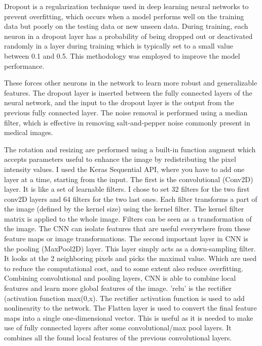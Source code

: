 \documentclass[twocolumn]{article}
\begin{document}
Dropout is a regularization technique used in deep learning neural networks to prevent overfitting, which occurs when a model performs well on the training data but poorly on the testing data or new unseen data.
During training, each neuron in a dropout layer has a probability of being dropped out or deactivated randomly in a layer during training which is typically set to a small value between 0.1 and 0.5.  This methodology was employed to improve the model performance.

These forces other neurons in the network to learn more robust and generalizable features.
The dropout layer is inserted between the fully connected layers of the neural network, and the input to the dropout layer is the output from the previous fully connected layer.
The noise removal is performed using a median filter, which is effective in removing salt-and-pepper noise commonly present in medical images. 

The rotation and resizing are performed using a built-in function augment which accepts parameters useful to enhance the image by redistributing the pixel intensity values. 
I used the Keras Sequential API, where you have to add one layer at a time, starting from the input. The first is the convolutional (Conv2D) layer. It is like a set of learnable filters. I chose to set 32 filters for the two first conv2D layers and 64 filters for the two last ones. Each filter transforms a part of the image (defined by the kernel size) using the kernel filter. The kernel filter matrix is applied to the whole image. Filters can be seen as a transformation of the image. The CNN can isolate features that are useful everywhere from these feature maps or image transformations.
The second important layer in CNN is the pooling (MaxPool2D) layer. This layer simply acts as a down-sampling filter. It looks at the 2 neighboring pixels and picks the maximal value. Which are used to reduce the computational cost, and to some extent also reduce overfitting. 
Combining convolutional and pooling layers, CNN is able to combine local features and learn more global features of the image.
'relu' is the rectifier (activation function max(0,x). The rectifier activation function is used to add nonlinearity to the network.
The Flatten layer is used to convert the final feature maps into a single one-dimensional vector. This is useful as it is needed to make use of fully connected layers after some convolutional/max pool layers. It combines all the found local features of the previous convolutional layers.
\end{document}

